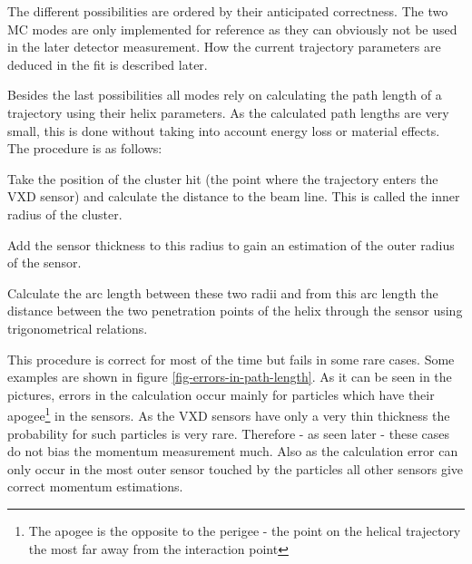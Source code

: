 The different possibilities are ordered by their anticipated correctness. The two MC modes are only implemented for reference as they can obviously not be used in the later detector measurement. How the current trajectory parameters are deduced in the fit is described later.

Besides the last possibilities all modes rely on calculating the path length of a trajectory using their helix parameters. As the calculated path lengths are very small, this is done without taking into account energy loss or material effects. The procedure is as follows:
\begin{zlist}
 \item Take the position of the cluster hit (the point where the trajectory enters the VXD sensor) and calculate the distance to the beam line. This is called the inner radius of the cluster.
 \item Add the sensor thickness to this radius to gain an estimation of the outer radius of the sensor.
 \item Calculate the arc length between these two radii and from this arc length the distance between the two penetration points of the helix through the sensor using trigonometrical relations.
\end{zlist}

This procedure is correct for most of the time but fails in some rare cases. Some examples are shown in figure \ref{fig-errors-in-path-length}. As it can be seen in the pictures, errors in the calculation occur mainly for particles which have their apogee\footnote{The apogee is the opposite to the perigee - the point on the helical trajectory the most far away from the interaction point} in the sensors. As the VXD sensors have only a very thin thickness the probability for such particles is very rare. Therefore - as seen later - these cases do not bias the momentum measurement much. Also as the calculation error can only occur in the most outer sensor touched by the particles all other sensors give correct momentum estimations. 

